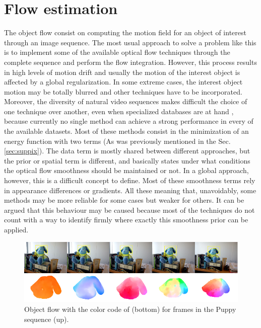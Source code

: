 \section{Flow estimation}
\label{sec:core}

The object flow consist on computing the motion field for an object of interest through an image
sequence. The most usual approach to solve a problem like this is to implement some of the available
optical flow techniques through the complete sequence and perform the flow integration. 
However, this process results in high levels of motion drift \cite{c18}\cite{c19} and usually the motion of the interest
object is affected by a global regularization. In some extreme cases, the interest object motion
may be totally blurred and other techniques have to be incorporated. Moreover, the diversity
of natural video sequences makes difficult the choice of one technique over another, even when specialized
databases are at hand \cite{c17}, because currently no single method can achieve a strong 
performance in every of the available datasets. Most of these methods consist in the minimization 
of an energy function with two terms (As was previously mentioned in the Sec. \ref{sec:suppix}). The data
term is mostly shared between different approaches, but the prior or spatial term is different, and basically states 
under what conditions the optical flow smoothness should be maintained or not. In a global approach, however,
this is a difficult concept to define. Most of these smoothness terms rely in appearance differences or gradients.
All these meaning that, unavoidably, some methods may be more reliable for some cases but weaker for others. 
It can be argued that this behaviour may be caused because most of the techniques do not count with a way to identify 
firmly where exactly this smoothness prior can be applied. 


   \begin{figure}[thpb]
      \centering
      \includegraphics[width=1.0\textwidth]{../images/objectflow.png}
      \caption{Object flow with the color code of \cite{c17} (bottom) for frames in the Puppy sequence (up). }
      \label{of}
   \end{figure}

